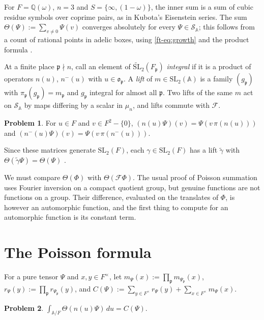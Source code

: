 \documentclass[reqno]{amsart}
\newcommand{\SL}{\mathrm{SL}_2}
\newcommand{\tSL}{\widetilde{\mathrm{SL}}_2}
\newcommand{\Fc}{\mathcal{F}}
\newcommand{\Sc}{\mathcal{S}}
\newcommand{\Ab}{\mathbb{A}}
\newcommand{\oo}{\mathfrak{o}}
\newcommand{\pp}{\mathfrak{p}}
\numberwithin{equation}{section}
\theoremstyle{definition}
\newtheorem{problem}{Problem}[section]
\theoremstyle{plain}
\begin{document}
For $F = \mathbb{Q}(\omega)$, $n = 3$ and $S = \{\infty, (1 - \omega)\}$, the inner sum is a sum of cubic residue symbols over coprime pairs, as in Kubota's Eisenstein series.  The sum $\Theta(\Psi) := \sum_{v \neq 0} \Psi(v)$ converges absolutely for every $\Psi \in \Sc_\Ab$; this follows from a count of rational points in adelic boxes, using \eqref{ft-eq:growth} and the product formula \cite[Lemma~B.1]{N}.

At a finite place $\pp \nmid n$, call an element of $\tSL(F_\pp)$ \emph{integral} if it is a product of operators $n(u)$, $n^-(u)$ with $u \in \oo_\pp$.  A \emph{lift} of $m \in \SL(\Ab)$ is a family $(g_\pp)$ with $\pi_\pp(g_\pp) = m_\pp$ and $g_\pp$ integral for almost all $\pp$.  Two lifts of the same $m$ act on $\Sc_\Ab$ by maps differing by a scalar in $\mu_n$, and lifts commute with $\Fc$.

\begin{problem}\label{pr:rational-invariance}
  For $u \in F$ and $v \in F^2 - \{0\}$, $(n(u) \Psi)(v) = \Psi(v \, \pi(n(u)))$ and $(n^-(u) \Psi)(v) = \Psi(v \, \pi(n^-(u)))$.
\end{problem}

Since these matrices generate $\SL(F)$, each $\gamma \in \SL(F)$ has a lift $\tilde{\gamma}$ with $\Theta(\tilde{\gamma} \Psi) = \Theta(\Psi)$ \cite[Lemma~B.5]{N}.

We must compare $\Theta(\Phi)$ with $\Theta(\Fc \Phi)$.  The usual proof of Poisson summation uses Fourier inversion on a compact quotient group, but genuine functions are not functions on a group.  Their difference, evaluated on the translates of $\Phi$, is however an automorphic function, and the first thing to compute for an automorphic function is its constant term.

\section{The Poisson formula}\label{sec:poisson}

For a pure tensor $\Psi$ and $x, y \in F^\times$, let $m_\Psi(x) := \prod_\pp m_{\Psi_\pp}(x)$, $r_\Psi(y) := \prod_\pp r_{\Psi_\pp}(y)$, and $C(\Psi) := \sum_{y \in F^\times} r_\Psi(y) + \sum_{x \in F^\times} m_\Psi(x)$.

\begin{problem}\label{pr:constant-term}
  $\int_{\Ab / F} \Theta(n(u) \Psi) \, d u = C(\Psi)$.
\end{problem}
\end{document}
